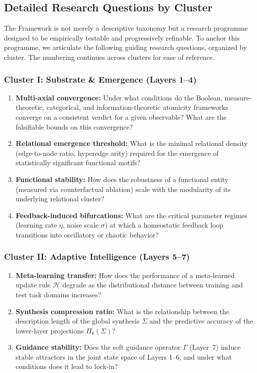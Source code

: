 \subsection{Detailed Research Questions by Cluster}
\label{subsec:detailed_rq}

The \Apeiron{} Framework is not merely a descriptive taxonomy but a research programme designed to be empirically testable and progressively refinable. To anchor this programme, we articulate the following guiding research questions, organized by cluster. The numbering continues across clusters for ease of reference.

\subsubsection{Cluster I: Substrate \& Emergence (Layers 1--4)}
\begin{enumerate}[label=RQ\arabic*:, leftmargin=2.5cm, series=rq]
    \item \textbf{Multi-axial convergence:} Under what conditions do the Boolean, measure-theoretic, categorical, and information-theoretic atomicity frameworks converge on a consistent verdict for a given observable? What are the falsifiable bounds on this convergence?
    \item \textbf{Relational emergence threshold:} What is the minimal relational density (edge-to-node ratio, hyperedge arity) required for the emergence of statistically significant functional motifs?
    \item \textbf{Functional stability:} How does the robustness of a functional entity (measured via counterfactual ablation) scale with the modularity of its underlying relational cluster?
    \item \textbf{Feedback-induced bifurcations:} What are the critical parameter regimes (learning rate $\eta$, noise scale $\sigma$) at which a homeostatic feedback loop transitions into oscillatory or chaotic behavior?
\end{enumerate}

\subsubsection{Cluster II: Adaptive Intelligence (Layers 5--7)}
\begin{enumerate}[label=RQ\arabic*:, leftmargin=2.5cm, resume=rq]
    \item \textbf{Meta-learning transfer:} How does the performance of a meta-learned update rule $\mathcal{H}$ degrade as the distributional distance between training and test task domains increases?
    \item \textbf{Synthesis compression ratio:} What is the relationship between the description length of the global synthesis $\Sigma$ and the predictive accuracy of the lower-layer projections $\Pi_k(\Sigma)$?
    \item \textbf{Guidance stability:} Does the soft guidance operator $\Gamma$ (Layer~7) induce stable attractors in the joint state space of Layers 1--6, and under what conditions does it lead to lock-in?
\end{enumerate}

